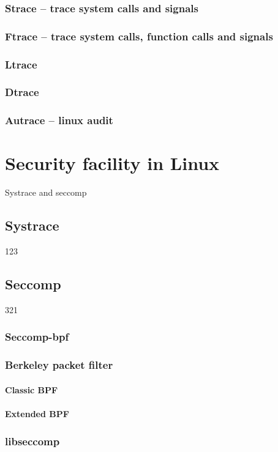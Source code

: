 \subsection{Strace -- trace system calls and signals}
\subsection{Ftrace -- trace system calls, function calls and signals}
\subsection{Ltrace}
\subsection{Dtrace}
\subsection{Autrace -- linux audit}

\chapter{Security facility in Linux}
Systrace and seccomp\cite{Pravidla}
\section{Systrace}
123

\section{Seccomp}
321
\subsection{Seccomp-bpf}

\subsection{Berkeley packet filter}
\subsubsection{Classic BPF}
\subsubsection{Extended BPF}

\subsection{libseccomp}


